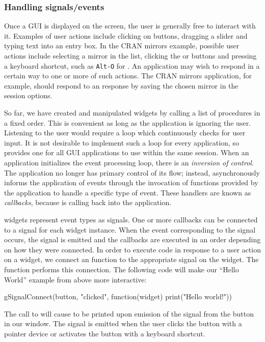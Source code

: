 \documentclass[article,shortnames]{jss}
\begin{document}
\subsubsection{Handling signals/events}

Once a GUI is displayed on the screen, the user is generally free to
interact with it. Examples of user actions include clicking on
buttons, dragging a slider and typing text into an entry box.  In the
CRAN mirrors example, possible user actions include selecting a mirror
in the list, clicking the  or  buttons and
pressing a
keyboard shortcut, such as \texttt{Alt-O} for .  An
application
may wish to respond in a certain way to one or more of such actions.
The CRAN mirrors application, for example, should respond to an
response by saving the chosen mirror in the session options.

So far, we have created and manipulated widgets by calling a list of
procedures in a fixed order. This is convenient as long as the
application is ignoring the user. Listening to the user would require
a loop which continuously checks for user input.  It is not desirable
to implement such a loop for every application, so  provides
one for all GUI applications to use within the same 
session. When an
application initializes the  event processing loop, there is
an \emph{inversion of control}. The application no longer has primary
control of its flow; instead,  asynchronously informs the
application of events through the invocation of functions provided by
the application to handle a specific type of event. These handlers are
known as \emph{callbacks}, because  is calling back into the
application.

 widgets represent event types as signals. One or more
callbacks can be connected to a signal for each widget instance. When
the event corresponding to the signal occurs, the signal is emitted
and the callbacks are executed in an order depending on how they were
connected. In order to execute  code in response to a user
action on a widget, we connect an  function to the
appropriate signal on the widget.  The  function
performs this connection. The following code will make our ``Hello
World'' example from above more interactive:  
\begin{Code}
gSignalConnect(button, "clicked", 
               function(widget) print("Hello world!"))
\end{Code}
The call to
 will cause  to be printed
upon emission of the  signal from the button in our
window.  The
 signal is emitted when the user clicks the button with
a pointer device or activates the button with a keyboard shortcut.
\end{document}
